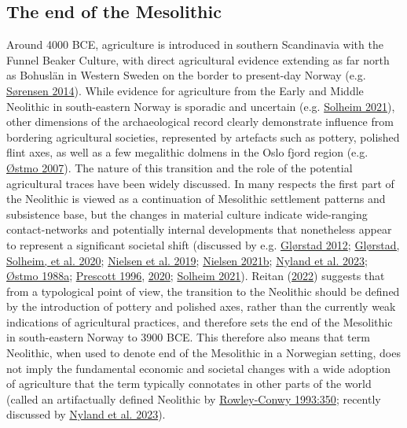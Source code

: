 \documentclass[
  12pt,
  a4paper,
  oneside]{book}
\begin{document}
\hypertarget{the-end-of-the-mesolithic}{%
\subsection{The end of the Mesolithic}\label{the-end-of-the-mesolithic}}

Around 4000 BCE, agriculture is introduced in southern Scandinavia with the Funnel Beaker Culture, with direct agricultural evidence extending as far north as Bohuslän in Western Sweden on the border to present-day Norway (e.g. \protect\hyperlink{ref-sorensen2014a}{Sørensen 2014}). While evidence for agriculture from the Early and Middle Neolithic in south-eastern Norway is sporadic and uncertain (e.g. \protect\hyperlink{ref-solheim2021}{Solheim 2021}), other dimensions of the archaeological record clearly demonstrate influence from bordering agricultural societies, represented by artefacts such as pottery, polished flint axes, as well as a few megalithic dolmens in the Oslo fjord region (e.g. \protect\hyperlink{ref-uxf8stmo2007}{Østmo 2007}). The nature of this transition and the role of the potential agricultural traces have been widely discussed. In many respects the first part of the Neolithic is viewed as a continuation of Mesolithic settlement patterns and subsistence base, but the changes in material culture indicate wide-ranging contact-networks and potentially internal developments that nonetheless appear to represent a significant societal shift (discussed by e.g. \protect\hyperlink{ref-glorstad2012}{Glørstad 2012}; \protect\hyperlink{ref-glorstad2020b}{Glørstad, Solheim, et al. 2020}; \protect\hyperlink{ref-nielsen2019}{Nielsen et al. 2019}; \protect\hyperlink{ref-nielsen2022}{Nielsen 2021b}; \protect\hyperlink{ref-nyland2023}{Nyland et al. 2023}; \protect\hyperlink{ref-ostmo1988}{Østmo 1988a}; \protect\hyperlink{ref-prescott1996}{Prescott 1996}, \protect\hyperlink{ref-prescott2020}{2020}; \protect\hyperlink{ref-solheim2021}{Solheim 2021}). Reitan (\protect\hyperlink{ref-reitan2022}{2022}) suggests that from a typological point of view, the transition to the Neolithic should be defined by the introduction of pottery and polished axes, rather than the currently weak indications of agricultural practices, and therefore sets the end of the Mesolithic in south-eastern Norway to 3900 BCE. This therefore also means that term Neolithic, when used to denote end of the Mesolithic in a Norwegian setting, does not imply the fundamental economic and societal changes with a wide adoption of agriculture that the term typically connotates in other parts of the world (called an \textquotesingle artifactually defined Neolithic\textquotesingle{} by \protect\hyperlink{ref-rowley-conwy1993}{Rowley-Conwy 1993:350}; recently discussed by \protect\hyperlink{ref-nyland2023}{Nyland et al. 2023}).
\end{document}
